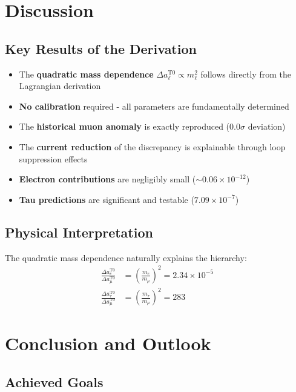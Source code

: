 \documentclass[12pt,a4paper]{article}
\theoremstyle{definition}
\begin{document}
	\section{Discussion}
	
	\subsection{Key Results of the Derivation}
	
	\begin{itemize}
		\item The \textbf{quadratic mass dependence} $\Delta a_\ell^{\text{T0}} \propto m_\ell^2$ follows directly from the Lagrangian derivation
		\item \textbf{No calibration} required - all parameters are fundamentally determined
		\item The \textbf{historical muon anomaly} is exactly reproduced ($0.0\sigma$ deviation)
		\item The \textbf{current reduction} of the discrepancy is explainable through loop suppression effects
		\item \textbf{Electron contributions} are negligibly small ($\sim 0.06 \times 10^{-12}$)
		\item \textbf{Tau predictions} are significant and testable ($7.09 \times 10^{-7}$)
	\end{itemize}
	
	\subsection{Physical Interpretation}
	
	The quadratic mass dependence naturally explains the hierarchy:
	\begin{align*}
		\frac{\Delta a_e^{\text{T0}}}{\Delta a_\mu^{\text{T0}}} &= \left(\frac{m_e}{m_\mu}\right)^2 = 2.34 \times 10^{-5}\\
		\frac{\Delta a_\tau^{\text{T0}}}{\Delta a_\mu^{\text{T0}}} &= \left(\frac{m_\tau}{m_\mu}\right)^2 = 283
	\end{align*}
	
	\section{Conclusion and Outlook}
	
	\subsection{Achieved Goals}
	
\end{document}
